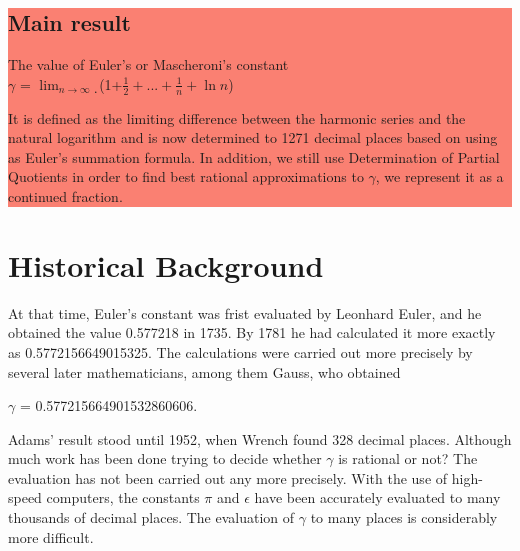 \documentclass{article}
\def\to{\rightarrow}
\begin{document}
	\setlength{\columnsep}{1cm}
	\begin{multicols}{3}
		\noindent
		\colorbox{salmon}{
			\begin{minipage}[t]{.96\linewidth}
				\vspace{.05cm}
				\begin{center}
					\vspace{.2cm}
					\section*{\Huge Main result}
					\Large The value of Euler's or Mascheroni's constant \\
					$\gamma$  =  $\lim_{n\to\infty}$ ̣(1+$\frac{1}{2}+...+\frac{1}{n}+\ln{n}$) 
				\end{center}
				
				\Large It is defined as the limiting difference between the harmonic series and the natural logarithm and is now determined to 1271 decimal places based on using  as Euler's summation formula. In addition, we still use Determination of Partial Quotients in order to find best rational approximations to $\gamma$, we represent it as a continued fraction. 
				\vspace{.1cm}
			\end{minipage}
		}
		\vspace{-0.5cm}
		\section*{Historical Background}
		\begin{minipage}[t]{.96\linewidth}
                \vspace{-0.5cm}  
			\Large At that time, Euler's constant was frist evaluated by Leonhard Euler, and he obtained the value 0.577218 in 1735. By 1781 he had calculated it more exactly as 0.5772156649015325. The calculations were carried out more precisely by several later mathematicians, among them Gauss, who obtained
			\begin{center}
				$\gamma$ = 0.577215664901532860606.    
			\end{center}
			\Large Adams' result stood until 1952, when Wrench found 328 decimal places.
			Although much work has been done trying to decide whether $\gamma$ is  rational or not? The
			evaluation has not been carried out any more precisely. With the use of high-speed
			computers, the constants $\pi$ and $\epsilon$ have been accurately evaluated to many thousands of decimal places. The evaluation of $\gamma$ to many places is considerably more difficult.
		\end{minipage}



\end{multicols}
\end{document}
